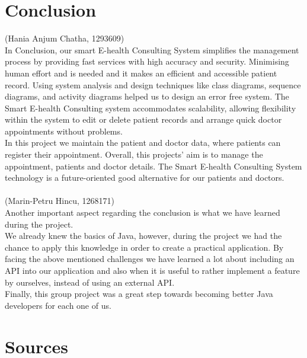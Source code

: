 \documentclass[a4paper, 12pt]{report}
\begin{document}
\chapter{Conclusion}
{\tiny (Hania Anjum Chatha, 1293609)\\}
In Conclusion, our smart E-health Consulting System simplifies the management process by providing fast services with high accuracy and security. Minimising human effort and is needed and it  makes an efficient and accessible patient record. Using system analysis and design techniques like class diagrams, sequence diagrams, and activity diagrams helped us to design an error free system. The Smart E-health Consulting system accommodates scalability, allowing flexibility within the system to edit or delete patient records and arrange quick doctor appointments without problems. \\
In this project we maintain the patient and doctor data, where patients can register their appointment. Overall, this projects' aim is to manage the appointment, patients and doctor details. The Smart E-health Consulting System technology is a future-oriented good alternative for our patients and doctors.\\\\
{\tiny (Marin-Petru Hincu, 1268171)\\}
Another important aspect regarding the conclusion is what we have learned during the project.\\
We already knew the basics of Java, however, during the project we had the chance to apply this knowledge in order to create a practical application. By facing the above mentioned challenges we have learned a lot about including an API into our application and also when it is useful to rather implement a feature by ourselves, instead of using an external API. \\
Finally, this group project was a great step towards becoming better Java developers for each one of us. 

\chapter{Sources}
\end{document}
